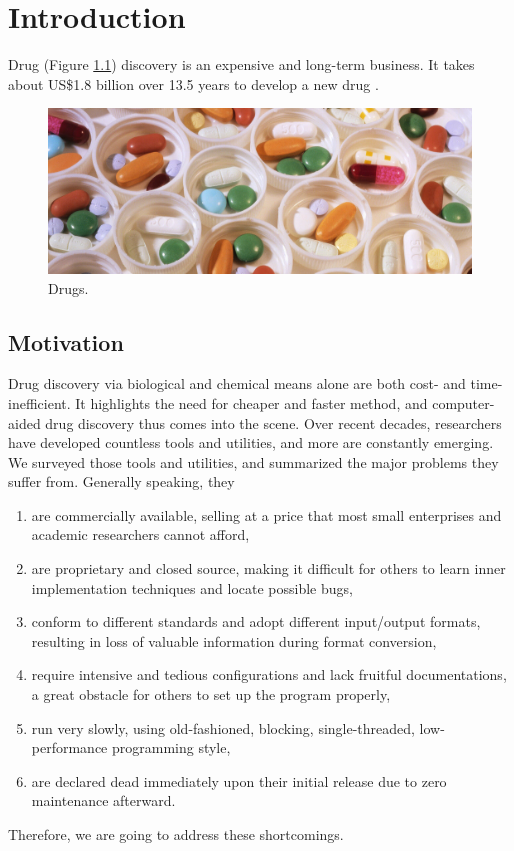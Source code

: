 \chapter{Introduction}

Drug (Figure \ref{Background:Drugs}) discovery is an expensive and long-term business. It takes about US\$1.8 billion over 13.5 years to develop a new drug \citep{716}.

\begin{figure}[h]
\centering
\includegraphics[width=\textwidth]{Background/Drugs.jpg}
\caption{Drugs.}
\label{Background:Drugs}
\end{figure}

\section{Motivation}

Drug discovery via biological and chemical means alone are both cost- and time-inefficient. It highlights the need for cheaper and faster method, and computer-aided drug discovery thus comes into the scene. Over recent decades, researchers have developed countless tools and utilities, and more are constantly emerging. We surveyed those tools and utilities, and summarized the major problems they suffer from. Generally speaking, they
\begin{enumerate}
\item are commercially available, selling at a price that most small enterprises and academic researchers cannot afford,
\item are proprietary and closed source, making it difficult for others to learn inner implementation techniques and locate possible bugs,
\item conform to different standards and adopt different input/output formats, resulting in loss of valuable information during format conversion,
\item require intensive and tedious configurations and lack fruitful documentations, a great obstacle for others to set up the program properly,
\item run very slowly, using old-fashioned, blocking, single-threaded, low-performance programming style,
\item are declared dead immediately upon their initial release due to zero maintenance afterward.
\end{enumerate}
Therefore, we are going to address these shortcomings.

